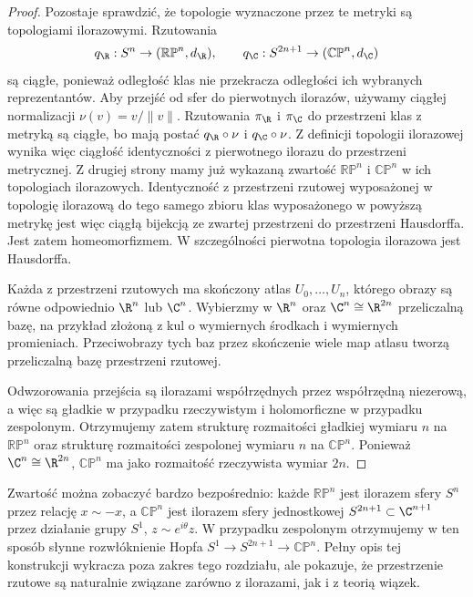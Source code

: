 \begin{proof}
Pozostaje sprawdzić, że topologie wyznaczone przez te metryki są
topologiami ilorazowymi. Rzutowania
\[
q_{\R}:S^n\to(\mathbb{RP}^n,d_{\R}),
\qquad
q_{\C}:S^{2n+1}\to(\mathbb{CP}^n,d_{\C})
\]
są ciągłe, ponieważ odległość klas nie przekracza odległości ich
wybranych reprezentantów. Aby przejść od sfer do pierwotnych ilorazów,
używamy ciągłej normalizacji $\nu(v)=v/\|v\|$.
Rzutowania $\pi_{\R}$ i $\pi_{\C}$ do przestrzeni klas z metryką są ciągłe,
bo mają postać $q_{\R}\circ\nu$ i $q_{\C}\circ\nu$.
Z definicji topologii ilorazowej wynika więc ciągłość identyczności
z pierwotnego ilorazu do przestrzeni metrycznej.
Z drugiej strony mamy już wykazaną zwartość
$\mathbb{RP}^n$ i $\mathbb{CP}^n$ w ich topologiach ilorazowych.
Identyczność z przestrzeni rzutowej wyposażonej w topologię ilorazową
do tego samego zbioru klas wyposażonego w powyższą metrykę jest więc
ciągłą bijekcją ze zwartej przestrzeni do przestrzeni Hausdorffa.
Jest zatem homeomorfizmem. W szczególności pierwotna topologia
ilorazowa jest Hausdorffa.

Każda z przestrzeni rzutowych ma skończony atlas $U_0,\ldots,U_n$,
którego obrazy są równe odpowiednio $\R^n$ lub $\C^n$. Wybierzmy
w $\R^n$ oraz $\C^n\cong\R^{2n}$ przeliczalną bazę, na przykład
złożoną z kul o wymiernych środkach i wymiernych promieniach.
Przeciwobrazy tych baz przez skończenie wiele map atlasu tworzą
przeliczalną bazę przestrzeni rzutowej.

Odwzorowania przejścia są ilorazami współrzędnych przez współrzędną
niezerową, a więc są gładkie w przypadku rzeczywistym i holomorficzne
w przypadku zespolonym. Otrzymujemy zatem strukturę rozmaitości
gładkiej wymiaru $n$ na $\mathbb{RP}^n$ oraz strukturę rozmaitości
zespolonej wymiaru $n$ na $\mathbb{CP}^n$. Ponieważ $\C^n\cong\R^{2n}$,
$\mathbb{CP}^n$ ma jako rozmaitość rzeczywista wymiar $2n$.
\end{proof}


\begin{uwaga}
Zwartość można zobaczyć bardzo bezpośrednio: każde $\mathbb{RP}^n$ jest ilorazem
sfery $S^n$ przez relację $x\sim-x$, a $\mathbb{CP}^n$ jest ilorazem sfery
jednostkowej $S^{2n+1}\subset\C^{n+1}$ przez działanie grupy $S^1$, $z\sim e^{i\theta}z$.
W przypadku zespolonym otrzymujemy w ten sposób słynne rozwłóknienie Hopfa
$S^1\longrightarrow S^{2n+1}\longrightarrow\mathbb{CP}^n$.
Pełny opis tej konstrukcji wykracza poza zakres tego rozdziału, ale pokazuje,
że przestrzenie rzutowe są naturalnie związane zarówno z ilorazami, jak i z teorią
wiązek.
\end{uwaga}

